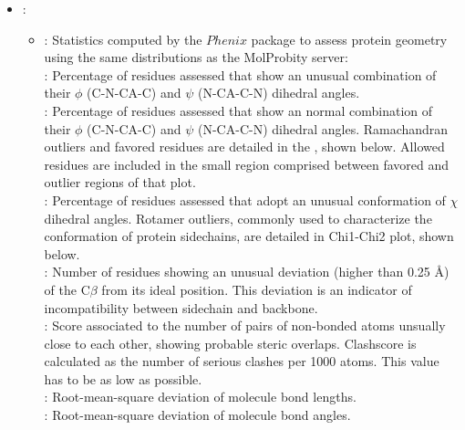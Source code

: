 \begin{itemize}
\begin{itemize}
        \begin{itemize}
         \item {}: 
          \begin{itemize}
           \item {}: Statistics computed by the $Phenix$ package to assess protein geometry using the same distributions as the MolProbity server:\setlength{\parindent}{12pt}\\
           
            : Percentage of residues assessed that show an unusual combination of their $\phi$ (C-N-CA-C) and $\psi$ (N-CA-C-N) dihedral angles.\\
            
            : Percentage of residues assessed that show an normal combination of their $\phi$ (C-N-CA-C) and $\psi$ (N-CA-C-N) dihedral angles. Ramachandran outliers and favored residues are detailed in the , shown below. Allowed residues are included in the small region comprised between favored and outlier regions of that plot.\\
            
            : Percentage of residues assessed that adopt an unusual conformation of $\chi$ dihedral angles. Rotamer outliers, commonly used to characterize the conformation of protein sidechains, are detailed in Chi1-Chi2 plot, shown below.\\
            
            : Number of residues showing an unusual deviation (higher than 0.25 \AA) of the C{$\beta$} from its ideal position. This deviation is an indicator of incompatibility between sidechain and backbone. \\
            
            : Score associated to the number of pairs of non-bonded atoms unsually close to each other, showing probable steric overlaps. Clashscore is calculated as the number of serious clashes per 1000 atoms. This value has to be as low as possible.\\
            
            : Root-mean-square deviation of molecule bond lengths.\\
            
            : Root-mean-square deviation of molecule bond angles.\\
            

\end{itemize}
\end{itemize}
\end{itemize}
\end{itemize}
